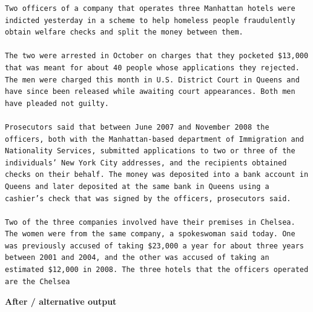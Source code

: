 \begin{Verbatim}
Two officers of a company that operates three Manhattan hotels were indicted yesterday in a scheme to help homeless people fraudulently obtain welfare checks and split the money between them.

The two were arrested in October on charges that they pocketed $13,000 that was meant for about 40 people whose applications they rejected. The men were charged this month in U.S. District Court in Queens and have since been released while awaiting court appearances. Both men have pleaded not guilty.

Prosecutors said that between June 2007 and November 2008 the officers, both with the Manhattan-based department of Immigration and Nationality Services, submitted applications to two or three of the individuals’ New York City addresses, and the recipients obtained checks on their behalf. The money was deposited into a bank account in Queens and later deposited at the same bank in Queens using a cashier’s check that was signed by the officers, prosecutors said.

Two of the three companies involved have their premises in Chelsea. The women were from the same company, a spokeswoman said today. One was previously accused of taking $23,000 a year for about three years between 2001 and 2004, and the other was accused of taking an estimated $12,000 in 2008. The three hotels that the officers operated are the Chelsea
\end{Verbatim}

\textbf{After / alternative output}


